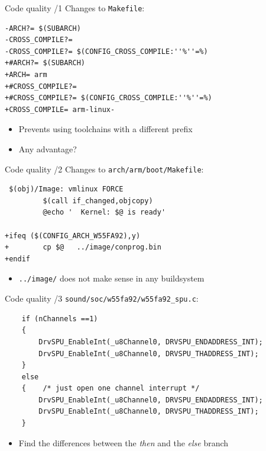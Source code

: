 \documentclass[xetex,table]{beamer}
\begin{document}
\begin{frame}[fragile]{Code quality /1}
  Changes to \texttt{Makefile}:

  \begin{verbatim}
-ARCH?= $(SUBARCH)
-CROSS_COMPILE?=
-CROSS_COMPILE?= $(CONFIG_CROSS_COMPILE:''%''=%)
+#ARCH?= $(SUBARCH)
+ARCH= arm
+#CROSS_COMPILE?=
+#CROSS_COMPILE?= $(CONFIG_CROSS_COMPILE:''%''=%)
+CROSS_COMPILE= arm-linux-
  \end{verbatim}

  \begin{itemize}
  \item Prevents using toolchains with a different prefix
  \item Any advantage?
  \end{itemize}
\end{frame}

\begin{frame}[fragile]{Code quality /2}
  Changes to \texttt{arch/arm/boot/Makefile}:

  \begin{verbatim}
 $(obj)/Image: vmlinux FORCE
         $(call if_changed,objcopy)
         @echo '  Kernel: $@ is ready'

+ifeq ($(CONFIG_ARCH_W55FA92),y)
+        cp $@   ../image/conprog.bin
+endif
  \end{verbatim}

  \begin{itemize}
  \item \texttt{../image/} does not make sense in any buildsystem
  \end{itemize}
\end{frame}

\begin{frame}[fragile]{Code quality /3}
  \texttt{sound/soc/w55fa92/w55fa92\_spu.c}:

  \begin{verbatim}
    if (nChannels ==1)
    {
        DrvSPU_EnableInt(_u8Channel0, DRVSPU_ENDADDRESS_INT);
        DrvSPU_EnableInt(_u8Channel0, DRVSPU_THADDRESS_INT);
    }
    else
    {    /* just open one channel interrupt */
        DrvSPU_EnableInt(_u8Channel0, DRVSPU_ENDADDRESS_INT);
        DrvSPU_EnableInt(_u8Channel0, DRVSPU_THADDRESS_INT);
    }
  \end{verbatim}

  \begin{itemize}
  \item Find the differences between the {\em then} and the {\em else} branch
  \end{itemize}
\end{frame}
\end{document}
